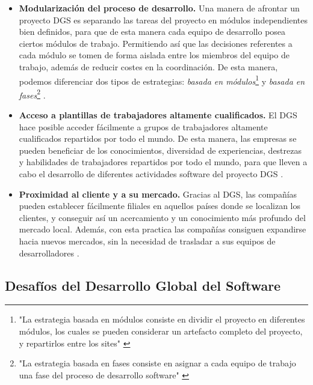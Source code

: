 \begin{itemize}
	\item \textbf{Modularización del proceso de desarrollo.} Una manera de afrontar un proyecto DGS es separando las tareas del proyecto en módulos independientes bien definidos, para que de esta manera cada equipo de desarrollo posea ciertos módulos de trabajo. Permitiendo así que las decisiones referentes a cada módulo se tomen de forma aislada entre los miembros del equipo de trabajo, además de reducir costes en la coordinación. De esta manera, podemos diferenciar dos tipos de estrategias: \emph{basada en módulos}\footnote{"La estrategia basada en módulos consiste en dividir el proyecto en diferentes módulos, los cuales se pueden considerar un artefacto completo del proyecto, y repartirlos entre los sites" \cite{piattini2014desarrollo}} y \emph{basada en fases}\footnote{"La estrategia basada en fases consiste en asignar a cada equipo de trabajo una fase del proceso de desarrollo software" \cite{piattini2014desarrollo}} \cite{conchuir2006exploring, conchuir2009global, aagerfalk2008benefits}.
	
	\item \textbf{Acceso a plantillas de trabajadores altamente cualificados.} El DGS hace posible acceder fácilmente a grupos de trabajadores altamente cualificados repartidos por todo el mundo. De esta manera, las empresas se pueden beneficiar de los conocimientos, diversidad de experiencias, destrezas y habilidades de trabajadores repartidos por todo el mundo, para que lleven a cabo el desarrollo de diferentes actividades software del proyecto DGS \cite{vizcaino2015vision, conchuir2006exploring, conchuir2009global, aagerfalk2008benefits}.
	
	\item \textbf{Proximidad al cliente y a su mercado.} Gracias al DGS, las compañías pueden establecer fácilmente filiales en aquellos países donde se localizan los clientes, y conseguir así un acercamiento y un conocimiento más profundo del mercado local. Además, con esta practica las compañías consiguen expandirse hacia nuevos mercados, sin la necesidad de trasladar a sus equipos de desarrolladores \cite{vizcaino2015vision, conchuir2006exploring, conchuir2009global, aagerfalk2008benefits}.
\end{itemize}

\subsection{Desafíos del Desarrollo Global del Software}
\label{sec:Desafios}

